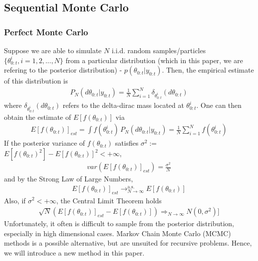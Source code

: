 \documentclass[12pt]{article}
\theoremstyle{definition}
\begin{document}
\subsection{Sequential Monte Carlo}
\subsubsection{Perfect Monte Carlo}
Suppose we are able to simulate $N$ i.i.d. random samples/particles $\{\theta_{0:t}^{i},i=1,2,...,N\}$ from a particular distribution (which in this paper, we are refering to the posterior distribution) - $p(\theta_{0:t}|y_{0:t})$. Then, the empirical estimate of this distribution is
\begin{equation}
	\begin{aligned}
		P_{N}(d\theta_{0:t}|y_{0:t}) = \frac{1}{N}\sum_{i=1}^{N}\delta_{\theta_{0:t}^{i}}(d\theta_{0:t})
	\end{aligned}
\end{equation}
where $\delta_{\theta_{0:t}^{i}}(d\theta_{0:t})$ refers to the delta-dirac mass located at $\theta_{0:t}^{i}$. One can then obtain the estimate of $E[f(\theta_{0:t})]$ via
\begin{equation}
	\begin{aligned}
		E[f(\theta_{0:t})]_{est} = \int f(\theta_{0:t}^{i}) \,P_{N}(d\theta_{0:t}|y_{0:t}) = \frac{1}{N}\sum_{i=1}^{N}f(\theta_{0:t}^{i})
	\end{aligned}
\end{equation}
If the posterior variance of $f(\theta_{0:t})$ satisfies \(\sigma^{2} :=\) $E[f(\theta_{0:t})^{2}] - E[f(\theta_{0:t})]^{2} < + \infty $, 
\begin{equation}
	\begin{aligned}
		var(E[f(\theta_{0:t})]_{est}) = \frac{\sigma^{2}}{N}
	\end{aligned}
\end{equation}
and by the Strong Law of Large Numbers,
\begin{equation}
	\begin{aligned}
		E[f(\theta_{0:t})]_{est} \mathrel{\mathop{\rightarrow}^{\mathrm{a.s.}}_{N \rightarrow \infty}} E[f(\theta_{0:t})]
	\end{aligned}
\end{equation}
Also, if $\sigma^{2} < +\infty$, the Central Limit Theorem holds
\begin{equation}
	\begin{aligned}
		\sqrt{N}(E[f(\theta_{0:t})]_{est} - E[f(\theta_{0:t})]) \mathrel{\mathop{\Longrightarrow}_{N \rightarrow \infty}} N(0,\sigma^{2})]
	\end{aligned}
\end{equation}
Unfortunately, it often is difficult to sample from the posterior distribution, especially in high dimensional cases. Markov Chain Monte Carlo (MCMC) methods is a possible alternative, but are unsuited for recursive problems. Hence, we will introduce a new method in this paper.
\end{document}

